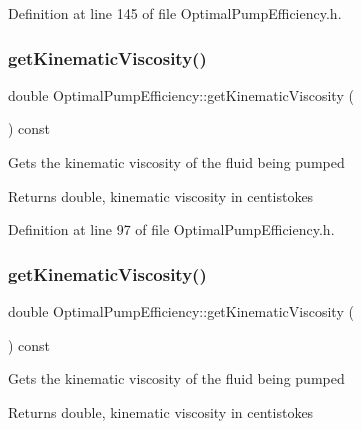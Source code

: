 Definition at line 145 of file Optimal\+Pump\+Efficiency.\+h.

\mbox{\label{class_optimal_pump_efficiency_a8c2f7fcacce2b42ed83f29aec2d4671e}} 
\subsubsection{\texorpdfstring{get\+Kinematic\+Viscosity()}{getKinematicViscosity()}\hspace{0.1cm}{\footnotesize\ttfamily [1/3]}}
{\footnotesize\ttfamily double Optimal\+Pump\+Efficiency\+::get\+Kinematic\+Viscosity (\begin{DoxyParamCaption}{ }\end{DoxyParamCaption}) const\hspace{0.3cm}{\ttfamily [inline]}}

Gets the kinematic viscosity of the fluid being pumped \begin{DoxyReturn}{Returns}
double, kinematic viscosity in centistokes 
\end{DoxyReturn}


Definition at line 97 of file Optimal\+Pump\+Efficiency.\+h.

\mbox{\label{class_optimal_pump_efficiency_a8c2f7fcacce2b42ed83f29aec2d4671e}} 
\subsubsection{\texorpdfstring{get\+Kinematic\+Viscosity()}{getKinematicViscosity()}\hspace{0.1cm}{\footnotesize\ttfamily [2/3]}}
{\footnotesize\ttfamily double Optimal\+Pump\+Efficiency\+::get\+Kinematic\+Viscosity (\begin{DoxyParamCaption}{ }\end{DoxyParamCaption}) const\hspace{0.3cm}{\ttfamily [inline]}}

Gets the kinematic viscosity of the fluid being pumped \begin{DoxyReturn}{Returns}
double, kinematic viscosity in centistokes 
\end{DoxyReturn}



